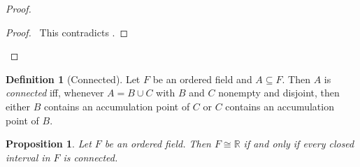 \documentclass{article}
\let\qed\relax
\newtheorem{proposition}[axiom]{Proposition}
\theoremstyle{definition}
\newtheorem{definition}[axiom]{Definition}
\begin{document}
\begin{proof}
    \pf
    \qedstep
    \begin{proof}
        \pf\ This contradicts .
    \end{proof}
    \qed
\end{proof}

\begin{definition}[Connected]
    Let $F$ be an ordered field and $A \subseteq F$. Then $A$ is \emph{connected} iff, whenever $A = B \cup C$ with $B$ and $C$ nonempty
    and disjoint, then either $B$ contains an accumulation point of $C$ or $C$ contains an accumulation point of $B$.
\end{definition}

\begin{proposition}
    Let $F$ be an ordered field. Then $F \cong \mathbb{R}$ if and only if every closed interval in $F$ is connected.
\end{proposition}
\end{document}
